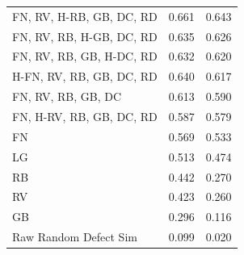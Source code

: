 \documentclass[twoside,twocolumn,9pt]{article}
\begin{document}
\begin{table}[h!]
{\begin{tabular}{lll}
            FN, RV, H-RB, GB, DC, RD                            & 0.661                                    & 0.643                                        \\
            FN, RV, RB, H-GB, DC, RD                            & 0.635                                    & 0.626                                        \\
            FN, RV, RB, GB, H-DC, RD                            & 0.632                                    & 0.620                                        \\
            H-FN, RV, RB, GB, DC, RD                            & 0.640                                    & 0.617                                        \\
            FN, RV, RB, GB, DC                                  & 0.613                                    & 0.590                                        \\
            FN, H-RV, RB, GB, DC, RD                            & 0.587                                    & 0.579                                        \\
            FN                                                  & 0.569                                    & 0.533
                                                 \\
            LG                                                  & 0.513                                    & 0.474 
            \\
            RB                                                  & 0.442                                    & 0.270                                        \\
            RV                                                  & 0.423                                    & 0.260                                        \\
            GB                                                  & 0.296                                    & 0.116
            \\
            Raw Random Defect Sim & 0.099 & 0.020
            
            \\ \hline
                                      
        \end{tabular}%
    }
    

\end{table}
\end{document}

